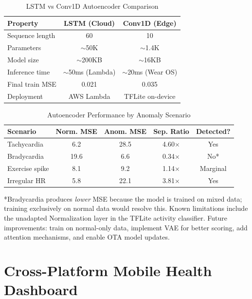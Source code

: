 \documentclass[conference]{IEEEtran}
\begin{document}
\begin{table}[H]
\centering
\caption{LSTM vs Conv1D Autoencoder Comparison}
\label{tab:model_comparison}
\begin{tabular}{lcc}
\toprule
\textbf{Property} & \textbf{LSTM (Cloud)} & \textbf{Conv1D (Edge)} \\
\midrule
Sequence length & 60 & 10 \\
Parameters & $\sim$50K & $\sim$1.4K \\
Model size & $\sim$200KB & $\sim$16KB \\
Inference time & $\sim$50ms (Lambda) & $\sim$20ms (Wear OS) \\
Final train MSE & 0.021 & 0.035 \\
Deployment & AWS Lambda & TFLite on-device \\
\bottomrule
\end{tabular}
\end{table}

\begin{table}[H]
\centering
\caption{Autoencoder Performance by Anomaly Scenario}
\label{tab:scenarios}
\begin{tabular}{lcccc}
\toprule
\textbf{Scenario} & \textbf{Norm. MSE} & \textbf{Anom. MSE} & \textbf{Sep. Ratio} & \textbf{Detected?} \\
\midrule
Tachycardia & 6.2 & 28.5 & 4.60$\times$ & Yes \\
Bradycardia & 19.6 & 6.6 & 0.34$\times$ & No* \\
Exercise spike & 8.1 & 9.2 & 1.14$\times$ & Marginal \\
Irregular HR & 5.8 & 22.1 & 3.81$\times$ & Yes \\
\bottomrule
\end{tabular}
\end{table}

*Bradycardia produces \textit{lower} MSE because the model is trained on mixed data; training exclusively on normal data would resolve this. Known limitations include the unadapted Normalization layer in the TFLite activity classifier. Future improvements: train on normal-only data, implement VAE for better scoring, add attention mechanisms, and enable OTA model updates.



\section{Cross-Platform Mobile Health Dashboard}
\end{document}
